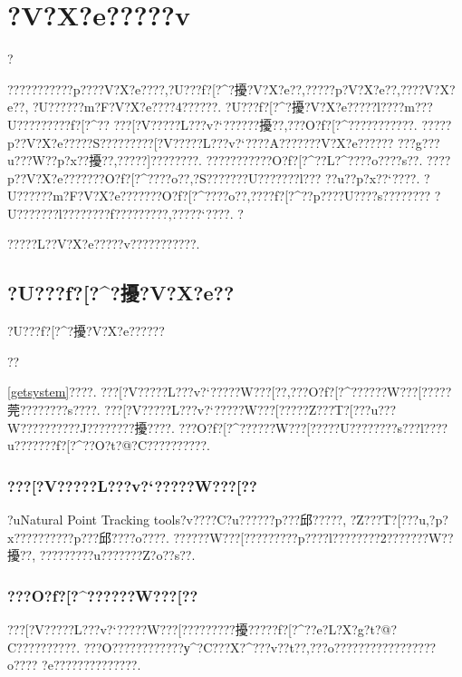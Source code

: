 \chapter{?V?X?e?????v}

?{???????????p????V?X?e????,?U???f?[?^?擾?V?X?e??,?????p?V?X?e??,????V?X?e??,
?U??????m?F?V?X?e????4??????.
?U???f?[?^?擾?V?X?e?????l????m???U?????????f?[?^??
???[?V?????L???v?`??????擾??,???O?f?[?^???????????.
?????p??V?X?e?????S?????????[?V?????L???v?`????A???????V?X?e??????
???g???u???W??p?x??擾??,?????]????????.
???????????O?f?[?^??L?^????o????s??.
????p??V?X?e???????O?f?[?^????o??,?S???????U???????l???
??u??p?x??`????.
?U??????m?F?V?X?e???????O?f?[?^????o??,????f?[?^??p????U????s????????
?U???????l????????f??????\????,?????`????.
?{?????L??V?X?e?????v???????????.

\section{?U???f?[?^?擾?V?X?e??}
?U???f?[?^?擾?V?X?e????\???}??}\ref{getsystem}????.
???[?V?????L???v?`?????W???[??,???O?f?[?^??????W???[?????莞????????s????.
???[?V?????L???v?`?????W???[?????Z???T?[???u???W??????????J????????擾????.
???O?f?[?^??????W???[?????U????????s???l????u???????f?[?^??O?t?@?C??????????.

\begin{comment}
\begin{figure}[!h]
\begin{center}

\texttt{[image: getsystem.eps]}
\caption{?U???f?[?^?擾?V?X?e??}
\label{getsystem}
\end{center}
\end{figure}
\end{comment}

\subsection{???[?V?????L???v?`?????W???[??}
?uNatural Point Tracking tools?v????C?u??????p???邱?????,
?Z???T?[???u,?p?x??????????p???邱????o????.
??????W???[?????????p????l????????2???????W??擾??,
?????????u???????Z?o??s??.

\subsection{???O?f?[?^??????W???[??}
???[?V?????L???v?`?????W???[?????????擾?????f?[?^??e?L?X?g?t?@?C??????????.
???O????????????у^?C???X?^???v??t??,???o?????????????????o????
?e??????????????.


